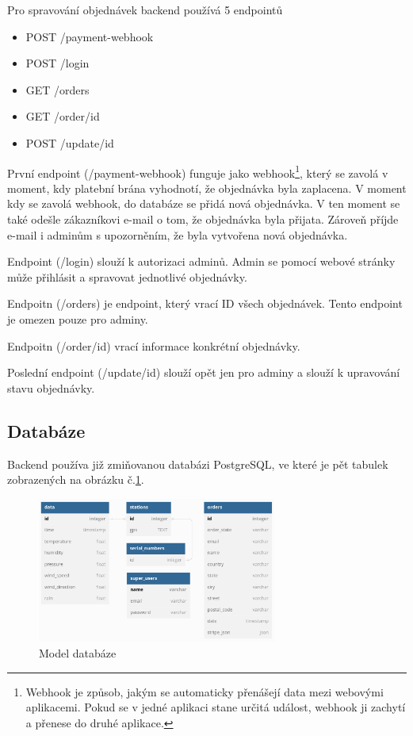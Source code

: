 Pro spravování objednávek backend používá 5 endpointů
\begin{itemize}
  \item POST /payment-webhook
  \item POST /login
  \item GET /orders
  \item GET /order/{id}
  \item POST /update/{id}
\end{itemize}
První endpoint (/payment-webhook) funguje jako webhook\footnote{Webhook je způsob, jakým se automaticky přenášejí data mezi webovými aplikacemi.
Pokud se v jedné aplikaci stane určitá událost, webhook ji zachytí a přenese do druhé aplikace.},
který se zavolá v moment, kdy platební brána vyhodnotí, že objednávka byla zaplacena. V moment kdy se zavolá webhook, do databáze se přidá nová objednávka. 
V ten moment se také odešle zákazníkovi e-mail o tom, že objednávka byla přijata. Zároveň příjde e-mail i adminům s upozorněním, že byla vytvořena nová objednávka.

Endpoint (/login) slouží k autorizaci adminů. Admin se pomocí webové stránky může přihlásit a spravovat jednotlivé objednávky.

Endpoitn (/orders) je endpoint, který vrací ID všech objednávek. Tento endpoint je omezen pouze pro adminy.

Endpoitn (/order/{id}) vrací informace konkrétní objednávky.

Poslední endpoint (/update/{id}) slouží opět jen pro adminy a slouží k upravování stavu objednávky.

\subsection{Databáze}
Backend používa již zmiňovanou databázi PostgreSQL, ve které je pět tabulek zobrazených na obrázku č.\ref{model_databaze}.

\begin{figure}[h] 
    \centering
    \includegraphics[width=0.7\textwidth]{images/database_diagram.png}
    \caption{Model databáze}
    \label{model_databaze}
\end{figure}
